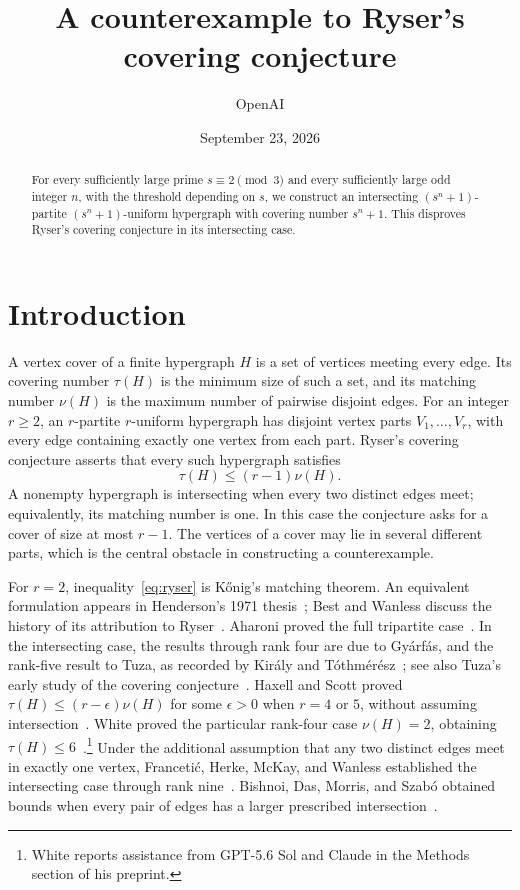 \documentclass[11pt]{article}
\title{A counterexample to Ryser's covering conjecture}
\author{OpenAI}
\date{September 23, 2026}
\theoremstyle{remark}
\begin{document}
\maketitle
\begin{abstract}
For every sufficiently large prime $s\equiv2\pmod3$ and every sufficiently
large odd integer $n$, with the threshold depending on $s$, we construct
an intersecting $(s^n+1)$-partite $(s^n+1)$-uniform hypergraph with covering
number $s^n+1$. This disproves Ryser's covering conjecture in its
intersecting case.
\end{abstract}

\section{Introduction}

A vertex cover of a finite hypergraph $H$ is a set of vertices meeting
every edge. Its covering number $\tau(H)$ is the minimum size of such a
set, and its matching number $\nu(H)$ is the maximum number of pairwise
disjoint edges. For an integer $r\ge2$, an $r$-partite $r$-uniform
hypergraph has disjoint vertex parts $V_1,\ldots,V_r$, with every edge
containing exactly one vertex from each part. Ryser's covering
conjecture asserts that every such hypergraph satisfies
\begin{equation}\label{eq:ryser}
 \tau(H)\le(r-1)\nu(H).
\end{equation}
A nonempty hypergraph is intersecting when every two distinct edges
meet; equivalently, its matching number is one. In this case the
conjecture asks for a cover of size at most $r-1$. The vertices of a
cover may lie in several different parts, which is the central
obstacle in constructing a counterexample.

For $r=2$, inequality~\eqref{eq:ryser} is K\H{o}nig's matching theorem.
An equivalent formulation appears in Henderson's 1971
thesis~\cite{Henderson1971}; Best and Wanless discuss the history of its
attribution to Ryser~\cite{BestWanless2018}. Aharoni proved the full
tripartite case~\cite{Aharoni2001}. In the intersecting case, the results
through rank four are due to Gy\'arf\'as, and the rank-five result to
Tuza, as recorded by Kir\'aly and T\'othm\'er\'esz~\cite{KiralyTothmeresz2017};
see also Tuza's early study of the covering conjecture~\cite{Tuza1983}.
Haxell and Scott proved $\tau(H)\le(r-\epsilon)\nu(H)$ for some
$\epsilon>0$ when $r=4$ or $5$, without assuming
intersection~\cite{HaxellScott2012}. White proved the particular
rank-four case $\nu(H)=2$, obtaining $\tau(H)\le6$~\cite{White2026}.\footnote{White
reports assistance from GPT-5.6 Sol and Claude in the Methods section
of his preprint.}
Under the additional assumption that any two distinct edges meet in
exactly one vertex, Franceti\'{c}, Herke, McKay, and Wanless established
the intersecting case through rank nine~\cite{FranceticHerkeMcKayWanless2017}.
Bishnoi, Das, Morris, and Szab\'o obtained bounds when every pair of
edges has a larger prescribed intersection~\cite{BDMS2021}.
\end{document}
